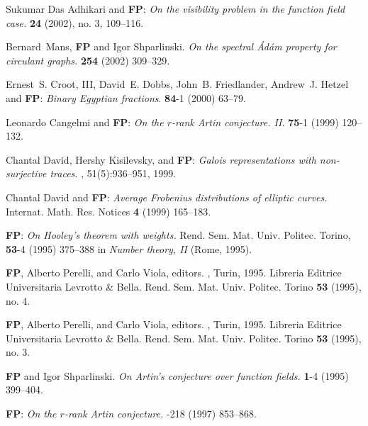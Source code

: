 \documentclass[12pt]{amsart}
\begin{document}
\begin{thebibliography}{10}
 Sukumar Das Adhikari and \textbf{F\!P}: \textit{On the
visibility problem in the function field case.}  \textbf{24} (2002), no. 3,
109--116.\bigskip

 Bernard~Mans, \textbf{F\!P} and Igor
Shparlinski. \textit{On the spectral \'{A}d\'{a}m property for
circulant graphs.}  \textbf{254}
(2002) 309--329.\bigskip

 Ernest~S. Croot, III, David~E. Dobbs, John~B.
Friedlander, Andrew~J. Hetzel and \textbf{F\!P}: \textit{Binary
{E}gyptian fractions}.  \textbf{84}-1
(2000) 63--79.\bigskip

 Leonardo Cangelmi and \textbf{F\!P}: \textit{On
the $r$-rank {A}rtin conjecture. {I}{I}.}  \textbf{75}-1 (1999) 120--132.\bigskip

 Chantal David, Hershy Kisilevsky, and
\textbf{F\!P}: \textit{Galois representations with non-surjective
traces.} , 51(5):936--951,
1999.\bigskip

 Chantal David and \textbf{F\!P}: \textit{Average
{F}robenius distributions of elliptic curves.} \newblock
{Internat. Math. Res. Notices} \textbf{4} (1999) 165--183.\bigskip

 \textbf{F\!P}: \textit{On {H}ooley's theorem with
weights.} {Rend. Sem. Mat. Univ. Politec. Torino}, \textbf{53}-4
(1995) 375--388 in \newblock \textit{Number theory, II} (Rome,
1995).\bigskip

 \textbf{F\!P}, Alberto Perelli, and Carlo Viola,
editors. , Turin, 1995.
Libreria Editrice Universitaria Levrotto \& Bella. \newblock Rend.
Sem. Mat. Univ. Politec. Torino {\bf 53} (1995), no. 4.\bigskip

 \textbf{F\!P}, Alberto Perelli, and Carlo Viola,
editors. , Turin, 1995. Libreria
Editrice Universitaria Levrotto \& Bella. \newblock Rend. Sem.
Mat. Univ. Politec. Torino {\bf 53} (1995), no. 3.\bigskip

 \textbf{F\!P} and Igor Shparlinski. \textit{On
{A}rtin's conjecture over function fields.}  \textbf{1}-4 (1995) 399--404.\bigskip

 \textbf{F\!P}: \textit{On the $r$-rank {A}rtin
conjecture.}  -218 (1997)
853--868.\bigskip


\end{thebibliography}
\end{document}
